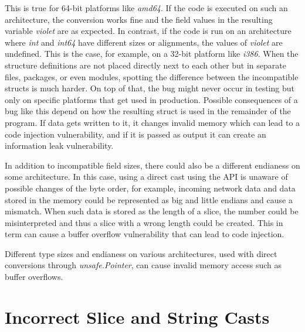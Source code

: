 

This is true for 64-bit platforms like \textit{amd64}.
If the code is executed on such an architecture, the conversion works fine and the field values in the resulting variable
\textit{violet} are as expected.
In contrast, if the code is run on an architecture where \textit{int} and \textit{int64} have different sizes or
alignments, the values of \textit{violet} are undefined.
This is the case, for example, on a 32-bit platform like \textit{i386}.
When the structure definitions are not placed directly next to each other but in separate files, packages, or even
modules, spotting the difference between the incompatible structs is much harder.
On top of that, the bug might never occur in testing but only on specific platforms that get used in production.
Possible consequences of a bug like this depend on how the resulting struct is used in the remainder of the program.
If data gets written to it, it changes invalid memory which can lead to a code injection vulnerability, and if it is
passed as output it can create an information leak vulnerability.

In addition to incompatible field sizes, there could also be a different endianess on some architecture.
In this case, using a direct cast using the \unsafe{} \acrshort{API} is unaware of possible changes of the byte order,
for example, incoming network data and data stored in the memory could be represented as big and little endians and
cause a mismatch.
When such data is stored as the length of a slice, the number could be misinterpreted and thus a slice with a wrong
length could be created.
This in term can cause a buffer overflow vulnerability that can lead to code injection.

\begin{insight}
    Different type sizes and endianess on various architectures, used with direct conversions through
    \textit{unsafe.Pointer}, can cause invalid memory access such as buffer overflows.
\end{insight}



\section{Incorrect Slice and String Casts}\label{sec:unsafe-security-problems:slice-casts}

